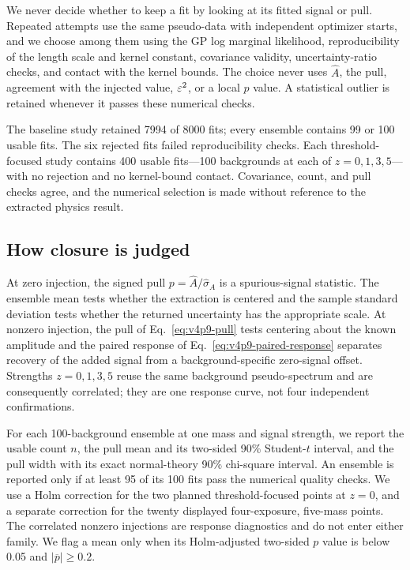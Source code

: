 We never decide whether to keep a fit by looking at its fitted signal or pull.
Repeated attempts use the same pseudo-data with independent optimizer starts, and we choose among them using
the GP log marginal likelihood, reproducibility of the length scale and kernel
constant, covariance validity, uncertainty-ratio checks, and contact with the kernel
bounds.  The choice never uses $\widehat A$, the pull, agreement with the injected
value, $\varepsilon^2$, or a local $p$ value.  A statistical outlier is retained whenever it
passes these numerical checks.

The baseline study retained 7994 of 8000 fits; every ensemble contains 99 or 100 usable
fits. The six rejected fits failed reproducibility checks. Each threshold-focused study
contains 400 usable fits---100 backgrounds at each of $z=0,1,3,5$---with no rejection
and no kernel-bound contact. Covariance, count, and pull checks agree, and the numerical
selection is made without reference to the extracted physics result.

\subsection{How closure is judged}

At zero injection, the signed pull
$p=\widehat A/\widehat\sigma_A$ is a spurious-signal statistic. The ensemble mean
tests whether the extraction is centered and the sample standard deviation tests
whether the returned uncertainty has the appropriate scale. At nonzero injection,
the pull of Eq.~\eqref{eq:v4p9-pull} tests centering about the known amplitude and the
paired response of Eq.~\eqref{eq:v4p9-paired-response} separates recovery of the
added signal from a background-specific zero-signal offset. Strengths
$z=0,1,3,5$ reuse the same background pseudo-spectrum and are consequently
correlated; they are one response curve, not four independent confirmations.

For each 100-background ensemble at one mass and signal strength, we report the usable
count $n$, the pull mean and its two-sided 90\% Student-$t$ interval, and the pull width
with its exact normal-theory 90\% chi-square interval. An ensemble is reported only if
at least 95 of its 100 fits pass the numerical quality checks. We use a Holm correction for
the two planned threshold-focused points at $z=0$, and a separate correction for the
twenty displayed four-exposure, five-mass points. The correlated nonzero injections are
response diagnostics and do not enter either family. We flag a mean only when its
Holm-adjusted two-sided $p$ value is below 0.05 and $|\overline p|\geq0.2$.

